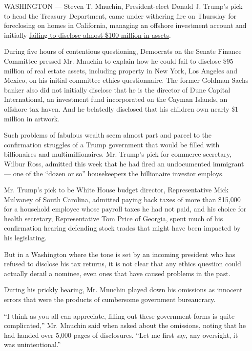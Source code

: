 WASHINGTON --- Steven T. Mnuchin, President-elect Donald J. Trump's pick
to head the Treasury Department, came under withering fire on Thursday
for foreclosing on homes in California, managing an offshore investment
account and initially
\href{https://www.nytimes.com/2017/01/19/us/politics/steven-mnuchin-treasury-secretary-nominee-assets-confirmation.html}{failing
to disclose almost \$100 million in assets}.

During five hours of contentious questioning, Democrats on the Senate
Finance Committee pressed Mr. Mnuchin to explain how he could fail to
disclose \$95 million of real estate assets, including property in New
York, Los Angeles and Mexico, on his initial committee ethics
questionnaire. The former Goldman Sachs banker also did not initially
disclose that he is the director of Dune Capital International, an
investment fund incorporated on the Cayman Islands, an offshore tax
haven. And he belatedly disclosed that his children own nearly \$1
million in artwork.

Such problems of fabulous wealth seem almost part and parcel to the
confirmation struggles of a Trump government that would be filled with
billionaires and multimillionaires. Mr. Trump's pick for commerce
secretary, Wilbur Ross, admitted this week that he had fired an
undocumented immigrant --- one of the ``dozen or so'' housekeepers the
billionaire investor employs.

Mr. Trump's pick to be White House budget director, Representative Mick
Mulvaney of South Carolina, admitted paying back taxes of more than
\$15,000 for a household employee whose payroll taxes he had not paid,
and his choice for health secretary, Representative Tom Price of
Georgia, spent much of his confirmation hearing defending stock trades
that might have been impacted by his legislating.

But in a Washington where the tone is set by an incoming president who
has refused to disclose his tax returns, it is not clear that any ethics
question could actually derail a nominee, even ones that have caused
problems in the past.

During his prickly hearing, Mr. Mnuchin played down his omissions as
innocent errors that were the products of cumbersome government
bureaucracy.

``I think as you all can appreciate, filling out these government forms
is quite complicated,'' Mr. Mnuchin said when asked about the omissions,
noting that he had handed over 5,000 pages of disclosures. ``Let me
first say, any oversight, it was unintentional.''


